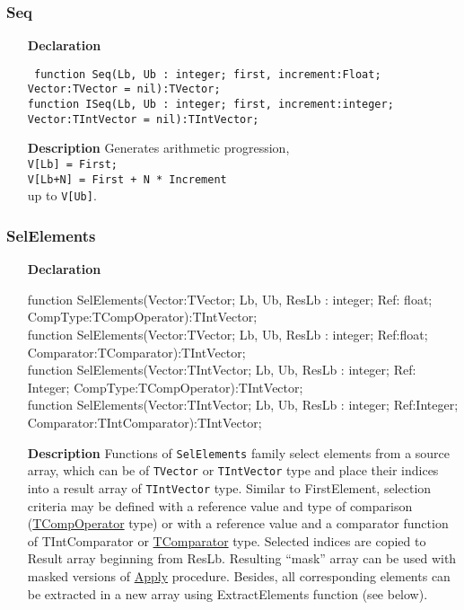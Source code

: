 \documentclass[12pt,a4paper,oneside]{report}
\newcommand{\declarationitem}[1]{\textbf{#1}}
\newcommand{\descriptiontitle}[1]{\textbf{#1}}
\newcommand{\code}[1]{\texttt{#1}}
\begin{document}
\subsubsection{Seq}
\label{uvecutils:seq}
\begin{itemize}
	\item[\declarationitem{Declaration}\hfill]
	\begin{flushleft}
\code{	function Seq(Lb, Ub : integer; first, increment:Float; Vector:TVector = nil):TVector;\\
	\vspace{4pt}
	function ISeq(Lb, Ub : integer; first, increment:integer; Vector:TIntVector = nil):TIntVector;
}	\end{flushleft}
	\item[\descriptiontitle{Description}\hfill]
	Generates arithmetic progression,\\
	 \code{V[Lb] = First; \\ V[Lb+N] = First + N * Increment}\\
	  up to \code{V[Ub]}. 
\end{itemize}
\subsubsection{SelElements}
\label{uvecutils:SelElements}
\begin{itemize}
	\item[\declarationitem{Declaration}\hfill]
	\begin{flushleft}
function SelElements(Vector:TVector; Lb, Ub, ResLb : integer; Ref: float; CompType:TCompOperator):TIntVector;\\
\vspace{4pt}
function SelElements(Vector:TVector; Lb, Ub, ResLb : integer; Ref:float; Comparator:TComparator):TIntVector;\\
\vspace{12pt}
function SelElements(Vector:TIntVector; Lb, Ub, ResLb : integer; Ref: Integer; CompType:TCompOperator):TIntVector; \\ \vspace{4pt}
function SelElements(Vector:TIntVector; Lb, Ub, ResLb : integer; Ref:Integer; Comparator:TIntComparator):TIntVector;
\end{flushleft}
	\item[\descriptiontitle{Description}\hfill]
Functions of \code{SelElements} family select elements from a source array, which can
be of \code{TVector} or \code{TIntVector} type and place their indices into a result array
of \code{TIntVector} type. Similar to FirstElement, selection criteria may be defined with a reference value and type of comparison (\hyperref[utypes-TCompOperator]{TCompOperator} type) or with a reference value and a comparator function of TIntComparator or \hyperref[utypes-TComparator]{TComparator}
type. Selected indices are copied to Result array beginning from ResLb. Resulting ``mask'' array can be used with masked versions of \hyperref[uvecutils:apply]{Apply} procedure. Besides, all corresponding elements can be extracted in a new array using ExtractElements function (see below).
\end{itemize}
\end{document}
